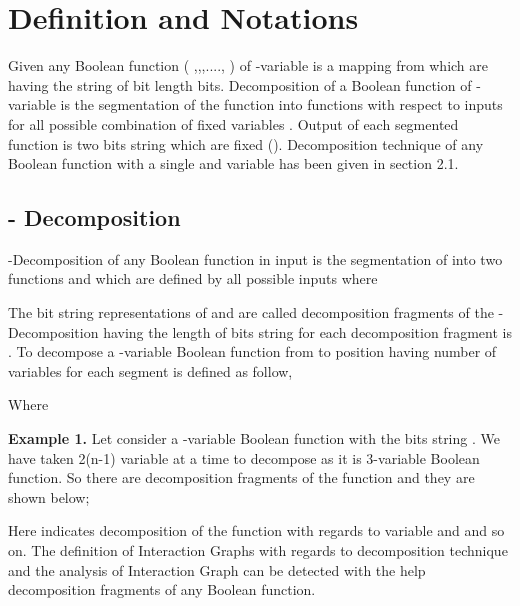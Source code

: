 \documentclass{article}
\begin{document}
\section{Definition and Notations}
Given any Boolean function ( ,,,...., ) of -variable is a mapping from  which are having the string of bit length  bits. Decomposition of a Boolean function of -variable is the segmentation of the function into  functions with respect to inputs for all possible combination of fixed variables . Output of each segmented function is two bits string which are fixed (). Decomposition technique of any Boolean function with a single and  variable has been given in section 2.1.

\subsection{ - Decomposition}
\noindent
 -Decomposition of any Boolean function  in input  is the segmentation of  into two functions  and  which are defined by all possible inputs  where 
  
 \begin{center}
   \resizebox{10cm}{!}
   {
    \centering
    
   }
 \end{center}
 
 The bit string representations of  and  are called decomposition fragments of the  -Decomposition having the length of bits string for each decomposition fragment is .
 To decompose a -variable Boolean function from  to position having  number of variables for each segment is defined as follow, 
  \begin{center}
     \resizebox{8cm}{!}
     {
      \centering
      
     }
   \end{center}
 Where 
 
 \textbf{Example 1.} Let consider a -variable Boolean function  with the bits string . We have taken 2(n-1) variable at a time to decompose  as it is 3-variable Boolean function. So there are  decomposition fragments of the function   and they are shown below; 
 \begin{center}
   \resizebox{10cm}{!}
   {
   \centering
      
      
      
 }
 \end{center}     
 Here  indicates decomposition of the function  with regards to variable  and  and so on. The definition of Interaction Graphs with regards to decomposition technique and the analysis of Interaction Graph can be detected with the help decomposition fragments of any Boolean function.
   
\end{document}
